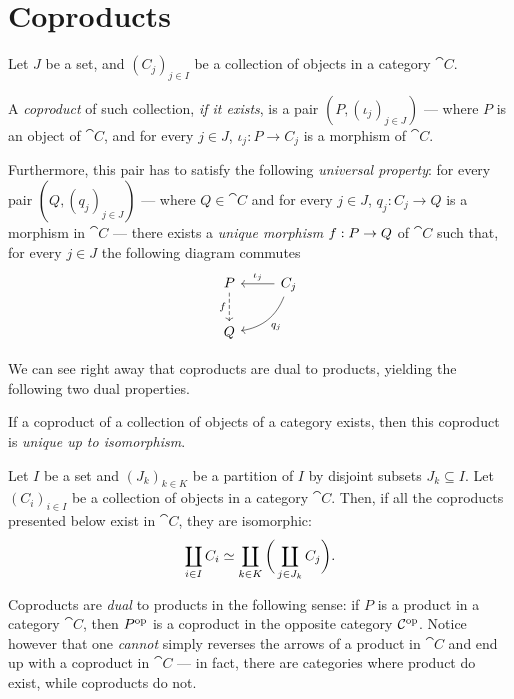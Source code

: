 \section{Coproducts}

\begin{definition}[Coproduct]
\label{def:coproduct}
Let \(J\) be a set, and \((C_j)_{j \in I}\) be a
collection of objects in a category \(\cat C\).

A \emph{coproduct} of such collection, \emph{if it exists}, is a pair
\((P, (\iota_j)_{j \in J})\) --- where \(P\) is an object of \(\cat C\), and for
every \(j \in J\), \(\iota_j: P \to C_j\) is a morphism of \(\cat C\).

Furthermore, this pair has to satisfy the following \emph{universal property}:
for every pair \((Q, (q_j)_{j \in J})\) --- where \(Q \in \cat C\) and for every
\(j \in J\), \(q_j: C_j \to Q\) is a morphism in \(\cat C\) --- there exists a
\emph{unique morphism} \(f: P \to Q\) of \(\cat C\) such that, for every
\(j \in J\) the following diagram commutes
\[
\begin{tikzcd}
P \ar[d, dashed, "f"']
&C_j \ar[l, "\iota_j"'] \ar[ld, bend left, "q_j"] \\
Q &
\end{tikzcd}
\]
\end{definition}

We can see right away that coproducts are dual to products, yielding the
following two dual properties.

\begin{proposition}[Uniqueness]
\label{prop:coproduct-unique-up-to-iso}
If a coproduct of a collection of objects of a category exists, then this
coproduct is \emph{unique up to isomorphism}.
\end{proposition}

\begin{proposition}
\label{prop:coproduct-ordering-independent}
Let \(I\) be a set and \((J_k)_{k \in K}\) be a partition of \(I\) by disjoint
subsets \(J_k \subseteq I\). Let \((C_i)_{i \in I}\) be a collection of objects
in a category \(\cat C\). Then, if all the coproducts presented below exist in
\(\cat C\), they are isomorphic:
\[
\coprod_{i \in I} C_i \simeq \coprod_{k \in K} \bigg(\coprod_{j \in J_k} C_j \bigg).
\]
\end{proposition}

\begin{remark}[Duality]
\label{rem:coproducts-dual-product}
Coproducts are \emph{dual} to products in the following sense: if \(P\) is a
product in a category \(\cat C\), then \(P^{\mathrm{op}}\) is a coproduct in the
opposite category \(\mathcal C^{\mathrm{op}}\). Notice however that one \emph{cannot} simply
reverses the arrows of a product in \(\cat C\) and end up with a coproduct in
\(\cat C\) --- in fact, there are categories where product do exist, while
coproducts do not.
\end{remark}

